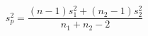 \documentclass[10pt]{article}
\begin{document}
\[s_p^2 = \frac{(n-1)s_1^2+(n_2-1)s_2^2}{n_1+n_2-2}\]
\end{document}
